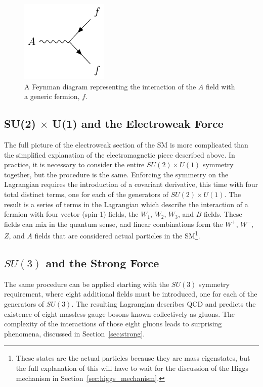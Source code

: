 \begin{figure}
\centering
\includegraphics[width=\halffig]{figures/feyn_aff.pdf}
\caption{A Feynman diagram representing the interaction of the $A$ field with a generic fermion, $f$.} 
\label{fig:feyn_aff}
\end{figure}


\subsection{SU(2) $\times$ U(1) and the Electroweak Force}

The full picture of the electroweak section of the \ac{SM} is more complicated than the simplified explanation of the electromagnetic piece described above. 
In practice, it is necessary to consider the entire $SU(2)\times U(1)$ symmetry together, but the procedure is the same.
Enforcing the symmetry on the Lagrangian requires the introduction of a covariant derivative, this time with four total distinct terms, one for each of the generators of $SU(2)\times U(1)$.
The result is a series of terms in the Lagrangian which describe the interaction of a fermion with four vector (spin-1) fields, the $W_1$, $W_2$, $W_3$, and $B$ fields.
These fields can mix in the quantum sense, and linear combinations form the $W^+$, $W^-$, $Z$, and $A$ fields that are considered actual particles in the \ac{SM}\footnote{These states are the actual particles because they are mass eigenstates, but the full explanation of this will have to wait for the discussion of the Higgs mechanism in Section~\ref{sec:higgs_mechanism}.}.

\subsection{$SU(3)$ and the Strong Force}

The same procedure can be applied starting with the $SU(3)$ symmetry requirement, where eight additional fields must be introduced, one for each of the generators of $SU(3)$.
The resulting Lagrangian describes \ac{QCD} and predicts the existence of eight massless gauge bosons known collectively as gluons. 
The complexity of the interactions of those eight gluons leads to surprising phenomena, discussed in Section~\ref{sec:strong}.

